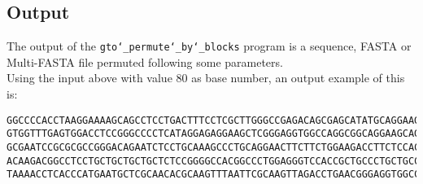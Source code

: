 \subsection*{Output}
The output of the \texttt{gto\char`_permute\char`_by\char`_blocks} program is a sequence, FASTA or Multi-FASTA file permuted following some parameters.\\
Using the input above with value 80 as base number, an output example of this is:
\begin{lstlisting}
GGCCCCACCTAAGGAAAAGCAGCCTCCTGACTTTCCTCGCTTGGGCCGAGACAGCGAGCATATGCAGGAAGCGGCAGGAA
GTGGTTTGAGTGGACCTCCGGGCCCCTCATAGGAGAGGAAGCTCGGGAGGTGGCCAGGCGGCAGGAAGCAGGCCAGTGCC
GCGAATCCGCGCGCCGGGACAGAATCTCCTGCAAAGCCCTGCAGGAACTTCTTCTGGAAGACCTTCTCCACCCCCCCAGC
ACAAGACGGCCTCCTGCTGCTGCTGCTCTCCGGGGCCACGGCCCTGGAGGGTCCACCGCTGCCCTGCTGCCATTGTCCCC
TAAAACCTCACCCATGAATGCTCGCAACACGCAAGTTTAATTCGCAAGTTAGACCTGAACGGGAGGTGGCCACGCAAGTT
\end{lstlisting}